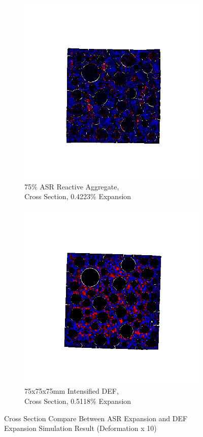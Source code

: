 \begin{figure}[ht]
\centering

    \begin{subfigure}{.5\textwidth}
      \centering
      \includegraphics[width=.8\linewidth]{Files/exp_3D/ASR/A30P75_3_stress.png}
      \caption{75\% ASR Reactive Aggregate, \\ Cross Section, 0.4223\% Expansion}
    \end{subfigure}%
    \begin{subfigure}{.5\textwidth}
      \centering
      \includegraphics[width=.8\linewidth]{Files/exp_3D/DEF/A30X-5C_3_stress.png}
      \caption{75x75x75mm Intensified DEF, \\ Cross Section, 0.5118\% Expansion}
    \end{subfigure}

    

  \caption{Cross Section Compare Between ASR Expansion and DEF Expansion Simulation Result (Deformation x 10)}
  \label{fig:ASRvsDEF_IS}
\end{figure}

